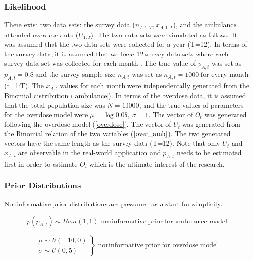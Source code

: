 \documentclass[12pt]{article}
\begin{document}
{\subsubsection{Likelihood}

\normalsize 
There exist two data sets: the survey data ($n_{A,1:T}, x_{A,1:T}$), and the ambulance attended overdose data ($U_{1:T}$). The two data sets were simulated as follows. It was assumed that the two data sets were collected for a year (T=12). In terms of the survey data, it is assumed that  we have 12 survey data sets where each survey data set was collected for each month . The true value of $p_{A,t}$ was set as $p_{A,t}=0.8$ and the survey sample size $n_{A,t}$ was set as $n_{A,t}=1000$ for every month (t=1:T). The $x_{A,t}$ values for each month were independentally generated from the Binomial distribution (\ref{ambulance}).  
In terms of the overdose data, it is assumed that the total population size was $N = 10000$, and the true values of parameters for the overdose model were $\mu=\log0.05,\ \sigma=1$.
The vector of $O_t$ was generated following the overdose model (\ref{overdose}). The vector of $U_t$ was generated from the Binomial relation of the two variables ($\ref{over_amb}$). The two generated vectors have the same length as the survey data (T=12).  Note that only $U_t$ and $x_{A,t}$ are observable in the real-world application and $p_{A,t}$ needs to be estimated first in order to estimate $O_t$ which is the ultimate interest of the research.\\


\subsubsection{Prior Distributions}
\normalsize Noninformative prior distributions are presumed as a start for simplicity. 

\begin{equation}
\label{nonin_prior_amb}
p(p_{A,t}) \sim Beta(1,1)
\text{			noninformative prior for ambulance model}
\end{equation} 

\begin{equation}
\label{noninprior_over}
\left.\begin{aligned}
\mu \sim U(-10,0)\\
\sigma \sim U(0,5)
\end{aligned}\right\} 
\text{			noninformative prior for overdose model}
\end{equation}

}
\end{document}
